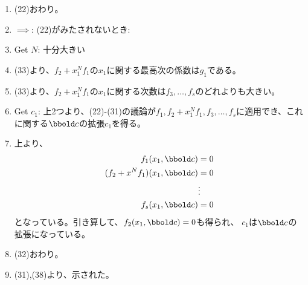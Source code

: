 \begin{myproof}
\begin{enumerate}[label=(\arabic*)]
    (27),(28)より、$c_1$は$f_i(x_1,\bbold c)$すべての共通根であり、
    部分解$\bbold c$が拡張されて$(c_1,\bbold c)$となった。
    \item (22)おわり。
    \item $\implies$: (22)がみたされないとき:
    \item Get $N$: 十分大きい
    \item (33)より、$f_2+x_1^N f_1$の$x_1$に関する最高次の係数は$g_1$である。
    \item (33)より、$f_2+x_1^N f_1$の$x_1$に関する次数は$f_3,\dots,f_s$のどれよりも大きい。
    \item Get $c_1$: 上2つより、(22)-(31)の議論が$f_1,f_2+x_1^N f_1,f_3,\dots,f_s$に適用でき、これに関する$\bbold c$の拡張$c_1$を得る。
    \item 上より、
    \begin{align}
      f_1(x_1,\bbold c) &= 0\\
      (f_2+x^Nf_1)(x_1,\bbold c) &= 0\\
      &\vdots\\
      f_s(x_1,\bbold c) &= 0
    \end{align}
    となっている。引き算して、$f_2(x_1,\bbold c)=0$も得られ、
    $c_1$は$\bbold c$の拡張になっている。
    \item (32)おわり。
    \item (31),(38)より、示された。
  \end{enumerate}
\end{myproof}
